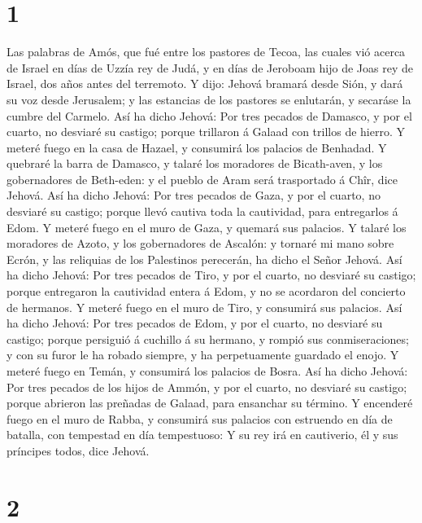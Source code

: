 \hypertarget{section}{%
\section{1}\label{section}}

 Las palabras de Amós, que fué entre los pastores de
Tecoa, las cuales vió acerca de Israel en días de Uzzía rey de Judá, y
en días de Jeroboam hijo de Joas rey de Israel, dos años antes del
terremoto.  Y dijo: Jehová bramará desde Sión, y dará su
voz desde Jerusalem; y las estancias de los pastores se enlutarán, y
secaráse la cumbre del Carmelo.  Así ha dicho Jehová: Por
tres pecados de Damasco, y por el cuarto, no desviaré su castigo; porque
trillaron á Galaad con trillos de hierro.  Y meteré fuego
en la casa de Hazael, y consumirá los palacios de Benhadad.
 Y quebraré la barra de Damasco, y talaré los moradores de
Bicath-aven, y los gobernadores de Beth-eden: y el pueblo de Aram será
trasportado á Chîr, dice Jehová.  Así ha dicho Jehová: Por
tres pecados de Gaza, y por el cuarto, no desviaré su castigo; porque
llevó cautiva toda la cautividad, para entregarlos á Edom.
 Y meteré fuego en el muro de Gaza, y quemará sus
palacios.  Y talaré los moradores de Azoto, y los
gobernadores de Ascalón: y tornaré mi mano sobre Ecrón, y las reliquias
de los Palestinos perecerán, ha dicho el Señor Jehová. 
Así ha dicho Jehová: Por tres pecados de Tiro, y por el cuarto, no
desviaré su castigo; porque entregaron la cautividad entera á Edom, y no
se acordaron del concierto de hermanos.  Y meteré fuego
en el muro de Tiro, y consumirá sus palacios.  Así ha
dicho Jehová: Por tres pecados de Edom, y por el cuarto, no desviaré su
castigo; porque persiguió á cuchillo á su hermano, y rompió sus
conmiseraciones; y con su furor le ha robado siempre, y ha perpetuamente
guardado el enojo.  Y meteré fuego en Temán, y consumirá
los palacios de Bosra.  Así ha dicho Jehová: Por tres
pecados de los hijos de Ammón, y por el cuarto, no desviaré su castigo;
porque abrieron las preñadas de Galaad, para ensanchar su término.
 Y encenderé fuego en el muro de Rabba, y consumirá sus
palacios con estruendo en día de batalla, con tempestad en día
tempestuoso:  Y su rey irá en cautiverio, él y sus
príncipes todos, dice Jehová.

\hypertarget{section-1}{%
\section{2}\label{section-1}}

